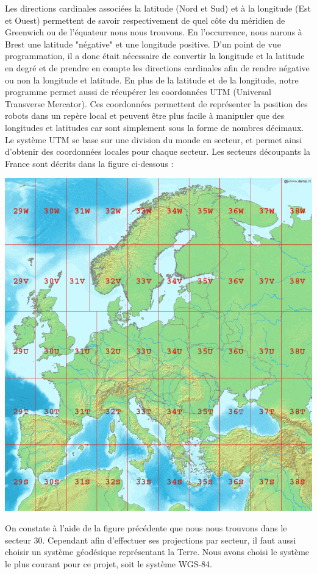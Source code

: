 \documentclass[10pt,a4paper]{report}
\begin{document}
Les directions cardinales associées la latitude (Nord et Sud) et à la longitude (Est et Ouest) permettent de savoir respectivement de quel côte du méridien de Greenwich ou de l'équateur nous nous trouvons. En l'occurrence, nous aurons à Brest une latitude "négative" et une longitude positive.\newline
D'un point de vue programmation, il a donc était nécessaire de convertir la longitude et la latitude en degré et de prendre en compte les directions cardinales afin de rendre négative ou non la longitude et latitude.\newline
En plus de la latitude et de la longitude, notre programme permet aussi de récupérer les coordonnées UTM (Universal Transverse Mercator). Ces coordonnées permettent de représenter la position des robots dans un repère local et peuvent être plus facile à manipuler que des longitudes et latitudes car sont simplement sous la forme de nombres décimaux. Le système UTM se base sur une division du monde en secteur, et permet ainsi d'obtenir des coordonnées locales pour chaque secteur. Les secteurs découpants la France sont décrits dans la figure ci-dessous :\newline
\begin{center}
\includegraphics[scale=0.2]{secteurUTM.png} 
\label{fig1}
\end{center}
On constate à l'aide de la figure précédente que nous nous trouvons dans le secteur 30. Cependant afin d'effectuer ses projections par secteur, il faut aussi choisir un système géodésique représentant la Terre. Nous avons choisi le système le plus courant pour ce projet, soit le système WGS-84.
\end{document}
